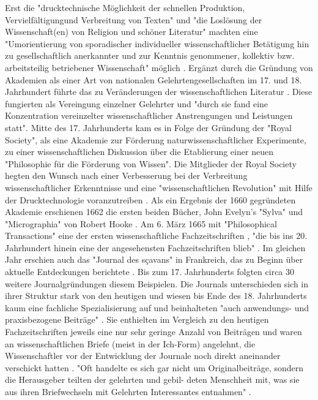 Erst die "drucktechnische Möglichkeit der schnellen Produktion, Vervielfältigungund Verbreitung von Texten" und "die Loslösung der Wissenschaft(en) von Religion und schöner Literatur" machten eine "Umorientierung von sporadischer individueller wissenschaftlicher Betätigung hin zu gesellschaftlich anerkannter und zur Kenntnis genommener, kollektiv bzw. arbeitsteilig betriebener Wissenschaft" möglich \cite{graefen2007_wissenschaftliche_artikel}. Ergänzt durch die Gründung von Akademien als einer Art von nationalen Gelehrtengesellschaften im 17. und 18. Jahrhundert führte das zu Veränderungen der wissenschaftlichen Literatur \cite{graefen2007_wissenschaftliche_artikel}. Diese fungierten als Vereingung einzelner Gelehrter und "durch sie fand eine Konzentration vereinzelter wissenschaftlicher Anstrengungen und Leistungen statt"\cite{graefen2007_wissenschaftliche_artikel}. Mitte des 17. Jahrhunderts kam es in Folge der Gründung der "Royal Society", als eine Akademie zur Förderung naturwissenschaftlicher Experimente, zu einer wissenschaftlichen Diskussion über die Etablierung einer neuen "Philosophie für die Förderung von Wissen". Die Mitglieder der Royal Society hegten den Wunsch nach einer Verbesserung bei der Verbreitung wissenschaftlicher Erkenntnisse und eine "wissenschaftlichen Revolution" mit Hilfe der Drucktechnologie voranzutreiben \cite{Dear_1985}. Als ein Ergebnis der 1660 gegründeten Akademie erschienen 1662 die ersten beiden Bücher, John Evelyn's "Sylva" und "Micrographia" von Robert Hooke \cite{hall_1992_library_rsol}. Am 6. März 1665 mit "Philosophical Transactions" eine der ersten wissenschaftliche Fachzeitschriften \cite{Peters_2014}, "die bis ins 20. Jahrhundert hinein eine der angesehensten Fachzeitschriften blieb" \cite{graefen2007_wissenschaftliche_artikel}. Im gleichen Jahr erschien auch das "Journal des sçavans" in Frankreich, das zu Beginn über aktuelle Entdeckungen berichtete \cite{epaa_Weiner_2001}. Bis zum 17. Jahrhunderts folgten circa 30 weitere Journalgründungen diesem Beispielen. Die Journals unterschieden sich in ihrer Struktur stark von den heutigen und wiesen bis Ende des 18. Jahrhunderts kaum eine fachliche Spezialisierung auf und beinhalteten "auch anwendungs- und praxisbezogene Beiträge" \cite{graefen2007_wissenschaftliche_artikel}. Sie enthielten im Vergleich zu den heutigen Fachzeitschriften jeweils eine nur sehr geringe Anzahl von Beiträgen \cite{suchen} und waren an wissenschaftlichen Briefe (meist in der Ich-Form) angelehnt, die Wissenschaftler vor der Entwicklung der Journale noch direkt aneinander verschickt hatten \cite{epaa_Weiner_2001}. "Oft handelte es sich gar nicht um Originalbeiträge, sondern die Herausgeber teilten der gelehrten und gebil- deten Menschheit mit, was sie aus ihren Briefwechseln mit Gelehrten Interessantes entnahmen" \cite{graefen2007_wissenschaftliche_artikel}.


